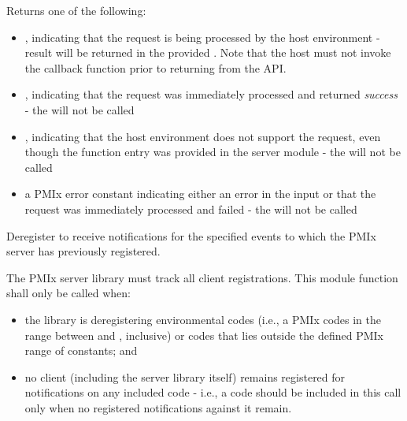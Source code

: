 Returns one of the following:

\begin{itemize}
    \item {}, indicating that the request is being processed by the host environment - result will be returned in the provided . Note that the host must not invoke the callback function prior to returning from the \ac{API}.
    \item {}, indicating that the request was immediately processed and returned \textit{success} - the  will not be called
    \item {}, indicating that the host environment does not support the request, even though the function entry was provided in the server module - the  will not be called
    \item a PMIx error constant indicating either an error in the input or that the request was immediately processed and failed - the  will not be called
\end{itemize}

\descr

Deregister to receive notifications for the specified events to which the \ac{PMIx} server has previously registered.

\adviceimplstart
The \ac{PMIx} server library must track all client registrations. This module function shall only be called when:

\begin{itemize}
    \item the library is deregistering environmental codes (i.e., a \ac{PMIx} codes in the range between  and , inclusive) or codes that lies outside the defined \ac{PMIx} range of constants; and
    \item no client (including the server library itself) remains registered for notifications on any included code - i.e., a code should be included in this call only when no registered notifications against it remain.
\end{itemize}

\adviceimplend


\subsection{}

